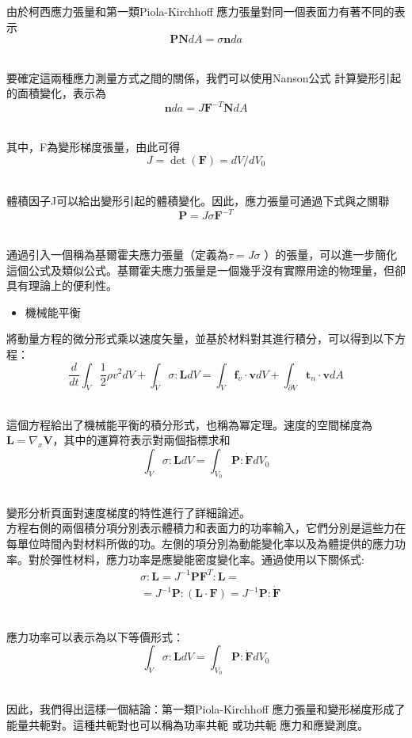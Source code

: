 由於柯西應力張量和第一類Piola-Kirchhoff 應力張量對同一個表面力有著不同的表示\
$$\mathbf{P N} d A=\sigma \mathbf{n} d a$$\

要確定這兩種應力測量方式之間的關係，我們可以使用Nanson公式 計算變形引起的面積變化，表示為\
$$\mathbf{n} d a=J \mathbf{F}^{-T} \mathbf{N} d A$$\

其中，F為變形梯度張量，由此可得\
$$J=\operatorname{det}(\mathbf{F})=d V / d V_0$$\

體積因子J可以給出變形引起的體積變化。因此，應力張量可通過下式與之關聯\
$$\mathbf{P}=J \sigma \mathbf{F}^{-T}$$\

通過引入一個稱為基爾霍夫應力張量（定義為$\tau=J \sigma$ ）的張量，可以進一步簡化這個公式及類似公式。基爾霍夫應力張量是一個幾乎沒有實際用途的物理量，但卻具有理論上的便利性。\\

\begin{itemize}
\item 機械能平衡
\end{itemize}

將動量方程的微分形式乘以速度矢量，並基於材料對其進行積分，可以得到以下方程：\
$$\frac{d}{d t} \int_V \frac{1}{2} \rho v^2 d V+\int_V \sigma: \mathbf{L} d V=\int_V \mathbf{f}_v \cdot \mathbf{v} d V+\int_{\partial V} \mathbf{t}_n \cdot \mathbf{v} d A$$\

這個方程給出了機械能平衡的積分形式，也稱為冪定理。速度的空間梯度為$\mathbf{L}=\nabla_x \mathbf{V}$，其中的運算符表示對兩個指標求和\
$$\int_V \sigma: \mathbf{L} d V=\int_{V_0} \mathbf{P}: \dot{\mathbf{F}} d V_0$$\

變形分析頁面對速度梯度的特性進行了詳細論述。\\

方程右側的兩個積分項分別表示體積力和表面力的功率輸入，它們分別是這些力在每單位時間內對材料所做的功。左側的項分別為動能變化率以及為體提供的應力功率。對於彈性材料，應力功率是應變能密度變化率。通過使用以下關係式:\
$$
\begin{aligned}
& \sigma: \mathbf{L}=J^{-1} \mathbf{P} \mathbf{F}^T: \mathbf{L}= \\
& =J^{-1} \mathbf{P}:(\mathbf{L} \cdot \mathbf{F})=J^{-1} \mathbf{P}: \dot{\mathbf{F}}
\end{aligned}
$$\

應力功率可以表示為以下等價形式：\
$$\int_V \sigma: \mathbf{L} d V=\int_{V_0} \mathbf{P}: \dot{\mathbf{F}} d V_0$$\

因此，我們得出這樣一個結論：第一類Piola-Kirchhoff 應力張量和變形梯度形成了能量共軛對。這種共軛對也可以稱為功率共軛 或功共軛 應力和應變測度。\\

